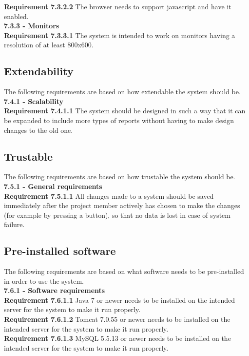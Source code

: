 \documentclass{article}
\begin{document}
\textbf{Requirement 7.3.2.2} 
The browser needs to support javascript and have it enabled.\\

{\fontsize{11}{11}\selectfont \noindent\textbf{7.3.3 - Monitors}} \\
\textbf{Requirement 7.3.3.1} 
The system is intended to work on monitors having a resolution of at least 800x600. \\

\subsection{Extendability}
The following requirements are based on how extendable the system should be. \\

{\fontsize{11}{11}\selectfont \noindent\textbf{7.4.1 - Scalability}} \\
\noindent\textbf{Requirement 7.4.1.1}
The system should be designed in such a way that it can be expanded to include more types of reports without having to make design changes to the old one.

\subsection{Trustable}
The following requirements are based on how trustable the system should be.\\

{\fontsize{11}{11}\selectfont \noindent\textbf{7.5.1 - General requirements}} \\
\noindent\textbf{Requirement 7.5.1.1}
All changes made to a system should be saved immediately after the project member actively has chosen to make the changes (for example by pressing a button), so that no data is lost in case of system failure. \\

\subsection{Pre-installed software}
The following requirements are based on what software needs to be pre-installed in order to use the system.\\

{\fontsize{11}{11}\selectfont \noindent\textbf{7.6.1 - Software requirements}} \\
\noindent\textbf{Requirement 7.6.1.1} 
Java 7 or newer needs to be installed on the intended server for the system to make it run properly. \\
\textbf{Requirement 7.6.1.2} 
Tomcat 7.0.55 or newer needs to be installed on the intended server for the system to make it run properly. \\
\textbf{Requirement 7.6.1.3}
MySQL 5.5.13 or newer needs to be installed on the intended server for the system to make it run properly. \\
\end{document}
